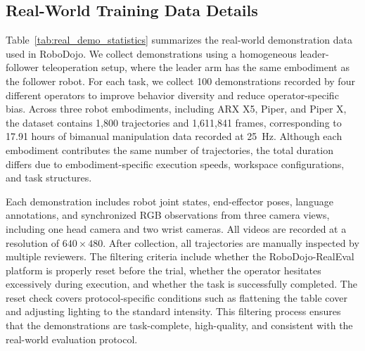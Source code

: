 \subsection{Real-World Training Data Details}
\label{appendix:real_demo_statistics}

Table~\ref{tab:real_demo_statistics} summarizes the real-world demonstration data used in RoboDojo. We collect demonstrations using a homogeneous leader-follower teleoperation setup, where the leader arm has the same embodiment as the follower robot. For each task, we collect 100 demonstrations recorded by four different operators to improve behavior diversity and reduce operator-specific bias. Across three robot embodiments, including ARX X5, Piper, and Piper X, the dataset contains 1,800 trajectories and 1,611,841 frames, corresponding to 17.91 hours of bimanual manipulation data recorded at 25~Hz. Although each embodiment contributes the same number of trajectories, the total duration differs due to embodiment-specific execution speeds, workspace configurations, and task structures.

\begin{table}[t]
\centering
\caption{\textbf{Real-world demonstration statistics.} The real-world dataset contains 1,611,841 frames from 1,800 trajectories across three robot embodiments, corresponding to 17.91 hours of bimanual manipulation data at 25~Hz. Each embodiment contains 600 trajectories from 6 tasks, while the duration differs due to embodiment-specific execution speeds and task structures.}
\label{tab:real_demo_statistics}
\small
\setlength{\tabcolsep}{4pt}
\end{table}

Each demonstration includes robot joint states, end-effector poses, language annotations, and synchronized RGB observations from three camera views, including one head camera and two wrist cameras. All videos are recorded at a resolution of $640 \times 480$. After collection, all trajectories are manually inspected by multiple reviewers. The filtering criteria include whether the RoboDojo-RealEval platform is properly reset before the trial, whether the operator hesitates excessively during execution, and whether the task is successfully completed. The reset check covers protocol-specific conditions such as flattening the table cover and adjusting lighting to the standard intensity. This filtering process ensures that the demonstrations are task-complete, high-quality, and consistent with the real-world evaluation protocol.


